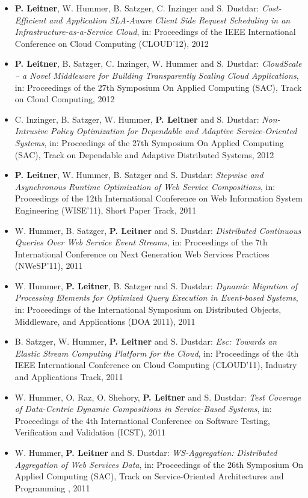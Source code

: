 \documentclass[paper=letter,fontsize=11pt]{scrartcl} %
\begin{document}
\begin{itemize}
\item \textbf{P. Leitner}, W. Hummer, B. Satzger, C. Inzinger and S. Dustdar:
\emph{Cost-Efficient and Application SLA-Aware Client Side Request Scheduling in an Infrastructure-as-a-Service Cloud}, in: Proceedings of the IEEE International Conference on Cloud Computing (CLOUD'12), 2012
\item \textbf{P. Leitner}, B. Satzger, C. Inzinger, W. Hummer and S. Dustdar:
\emph{CloudScale -- a Novel Middleware for Building Transparently Scaling
Cloud Applications}, in: Proceedings of the 27th Symposium On Applied Computing (SAC),
Track on Cloud Computing, 2012
\item C. Inzinger, B. Satzger, W. Hummer, \textbf{P. Leitner} and S. Dustdar:
\emph{Non-Intrusive Policy Optimization for Dependable and Adaptive Service-Oriented Systems}, in: Proceedings of the 27th Symposium On Applied Computing (SAC),
Track on Dependable and Adaptive Distributed Systems, 2012
\item \textbf{P. Leitner}, W. Hummer, B. Satzger and S. Dustdar:
\emph{Stepwise and Asynchronous Runtime Optimization of Web Service
Compositions}, in: Proceedings of the 12th International Conference on Web
Information System Engineering (WISE'11), Short Paper Track, 2011
\item W. Hummer, B. Satzger, \textbf{P. Leitner} and S. Dustdar:
\emph{Distributed Continuous Queries Over Web Service Event Streams}, in: Proceedings of the 7th International Conference on Next Generation Web Services Practices
(NWeSP'11), 2011
\item W. Hummer, \textbf{P. Leitner}, B. Satzger and S. Dustdar:
\emph{Dynamic Migration of Processing Elements for Optimized Query Execution in
Event-based Systems}, in: Proceedings of the International Symposium on Distributed
Objects, Middleware, and Applications (DOA 2011), 2011
\item B. Satzger, W. Hummer, \textbf{P. Leitner} and S. Dustdar:
\emph{Esc: Towards an Elastic Stream Computing Platform for the Cloud},
in: Proceedings of the 4th IEEE International Conference on Cloud Computing (CLOUD'11), Industry and Applications Track, 2011
\item W. Hummer, O. Raz, O. Shehory, \textbf{P. Leitner} and S. Dustdar:
\emph{Test Coverage of Data-Centric Dynamic Compositions in Service-Based
Systems}, in: Proceedings of the 4th International Conference on Software Testing,
Verification and Validation (ICST), 2011
\item W. Hummer, \textbf{P. Leitner} and S. Dustdar: \emph{WS-Aggregation: Distributed Aggregation of Web Services Data}, in: Proceedings of the 26th Symposium On Applied Computing (SAC), Track on Service-Oriented Architectures and Programming , 2011

\end{itemize}
\end{document}
